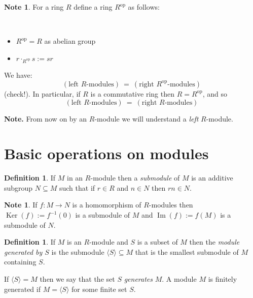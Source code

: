 \documentclass[12pt, letterpaper, oneside]{article}
\theoremstyle{plain}
\theoremstyle{definition}
\newtheorem{definition}[theorem]{Definition}
\newtheorem{note}[theorem]{Note}
\renewcommand{\Im}{\operatorname{Im}}
\newcommand{\Ker}{\operatorname{Ker}}
\newcommand{\subgp}[1]{\langle#1\rangle}
\newcommand{\bit}{\begin{itemize}}
\newcommand{\eit}{\end{itemize}}
\newcommand{\vs}{\vskip 5mm}
\begin{document}
\vs\vs

\begin{note}
For a ring $R$ define a ring $R^{\text{op}}$ as follows:

\vskip -13mm

\ 
\bit
\item $R^{\text{op}} = R$ as abelian group
\item $r\cdot_{R^{\text{op}}} s :=sr$
\eit

We have:
$$(\text{left $R$-modules}) \ = \  (\text{right $R^{\text{op}}$-modules})$$
(check!).  In particular, if $R$ is a commutative ring then $R= R^{\text{op}}$, and so 
$$(\text{left $R$-modules}) \ = \  (\text{right $R$-modules})$$

\end{note}

\vs\vs


\begin{framed}
\textbf{Note.} From now on by an $R$-module we will understand a \emph{left} $R$-module.
\end{framed}








\newpage
\section{Basic operations on modules}
\label{SEC_OPERONMODULES}

\begin{definition}
If $M$ in an $R$-module then a \emph{submodule} of $M$ is an additive 
subgroup  $N\subseteq M$ such that if $r\in R$ and $n\in N$ then 
$rn\in N$. 
\end{definition}


\vs\vs

\begin{note}
If $f\colon M \to N$ is a homomorphism of $R$-modules then $\Ker(f) := f^{-1}(0)$
is a submodule of $M$ and $\Im(f) := f(M)$ is a submodule of $N$.
\end{note}

\vs\vs

\begin{definition}
If $M$ is an $R$-module and $S$ is a subset of $M$ then the \emph{module generated 
by $S$} is the  submodule $\subgp{S}\subseteq M$ that is the smallest submodule of $M$ 
containing $S$. 

If $\subgp{S} = M$ then we say that the set $S$ \emph{generates} $M$. A module $M$
is finitely generated if $M= \subgp{S}$ for some finite set $S$. 

\end{definition}
\end{document}
